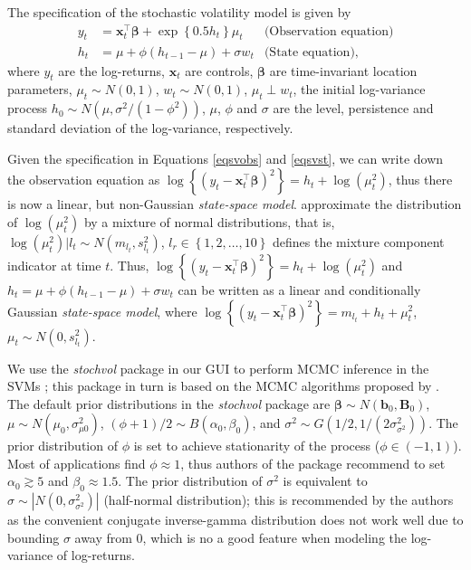 The specification of the stochastic volatility model is given by
\begin{align}
	y_t&=\bm{x}_t^{\top}\bm{\beta}+\exp\left\{0.5h_t\right\}\mu_t& \text{(Observation equation)}\label{eqsvobs}\\
	h_t&=\mu+\phi(h_{t-1}-\mu)+\sigma w_t& \text{(State equation)}\label{eqsvst},
\end{align}
where $y_t$ are the log-returns, $\bm{x}_t$ are controls, $\bm{\beta}$ are time-invariant location parameters, $\mu_t\sim N(0,1)$, $w_t\sim N(0,1)$, $\mu_t\perp w_t$, the initial log-variance process $h_0\sim N(\mu, \sigma^2/(1-\phi^2))$, $\mu$, $\phi$ and $\sigma$ are the level, persistence and standard deviation of the log-variance, respectively.

Given the specification in Equations \ref{eqsvobs} and \ref{eqsvst}, we can write down the observation equation as $\log\left\{(y_t-\bm{x}_t^{\top}\bm{\beta})^2\right\}=h_t+\log(\mu_t^2)$, thus there is now a linear, but non-Gaussian \textit{state-space model}. \cite{kastner2014ancillarity} approximate the distribution of $\log(\mu_t^2)$ by a mixture of normal distributions, that is, $\log(\mu_t^2)|l_t\sim N(m_{l_t},s_{l_t}^2)$, $l_r\in \left\{1,2,\dots,10\right\}$ defines the mixture component indicator at time $t$. Thus, $\log\left\{(y_t-\bm{x}_t^{\top}\bm{\beta})^2\right\}=h_t+\log(\mu_t^2)$ and $h_t=\mu+\phi(h_{t-1}-\mu)+\sigma w_t$ can be written as a linear and conditionally Gaussian \textit{state-space model}, where $\log\left\{(y_t-\bm{x}_t^{\top}\bm{\beta})^2\right\}=m_{l_t}+h_t+\mu_t^2$, $\mu_t\sim N(0, s_{l_t}^2)$.        

We use the \textit{stochvol} package in our GUI to perform MCMC inference in the SVMs \cite{hosszejni_kastner_2021}; this package in turn is based on the MCMC algorithms proposed by \cite{kastner2014ancillarity}. The default prior distributions in the \textit{stochvol} package are $\bm{\beta}\sim N(\bm{b}_0,\bm{B}_0)$, $\mu\sim N(\mu_0,\sigma_{\mu0}^2)$, $(\phi+1)/2\sim B(\alpha_0,\beta_0)$, and $\sigma^2\sim G(1/2,1/(2\sigma^2_{\sigma^2}))$. The prior distribution of $\phi$ is set to achieve stationarity of the process ($\phi\in(-1,1)$). Most of applications find $\phi\approx 1$, thus authors of the package recommend to set $\alpha_0 \gtrsim 5$ and $\beta_0\approx 1.5$. The prior distribution of $\sigma^2$ is equivalent to $\sigma\sim |N(0,\sigma^2_{\sigma^2})|$ (half-normal distribution); this is recommended by the authors as the convenient conjugate inverse-gamma distribution does not work well due to bounding $\sigma$ away from 0, which is no a good feature when modeling the log-variance of log-returns.

